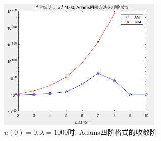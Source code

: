 \documentclass[12pt]{article}
\begin{document}
\begin{figure}[H]
	\centering
	\includegraphics[width=0.7\textwidth]{16}
	\caption{$u(0)=0, \lambda=1000$时, Adams四阶格式的收敛阶}
\end{figure}
\end{document}
